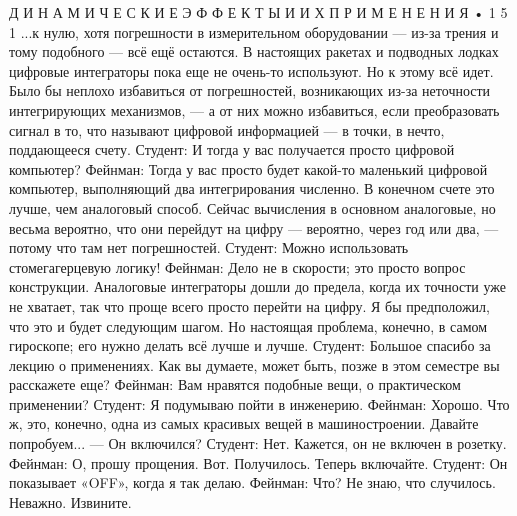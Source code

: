 \documentclass[10pt,oneside]{article}
\begin{document}
Д И Н А М И Ч Е С К И Е  Э Ф Ф Е К Т Ы  И  И Х  П Р И М Е Н Е Н И Я • 1 5 1 ...к нулю, хотя погрешности в измерительном оборудовании --- из-за трения и тому подобного --- всё ещё остаются. В настоящих ракетах и подводных лодках цифровые интеграторы пока еще не очень-то используют. Но к этому всё идет. Было бы неплохо избавиться от погрешностей, возникающих из-за неточности интегрирующих механизмов, --- а от них можно избавиться, если преобразовать сигнал в то, что называют цифровой информацией --- в точки, в нечто, поддающееся счету. Студент: И тогда у вас получается просто цифровой компьютер? Фейнман: Тогда у вас просто будет какой-то маленький цифровой компьютер, выполняющий два интегрирования численно. В конечном счете это лучше, чем аналоговый способ. Сейчас вычисления в основном аналоговые, но весьма вероятно, что они перейдут на цифру --- вероятно, через год или два, --- потому что там нет погрешностей. Студент: Можно использовать стомегагерцевую логику! Фейнман: Дело не в скорости; это просто вопрос конструкции. Аналоговые интеграторы дошли до предела, когда их точности уже не хватает, так что проще всего просто перейти на цифру. Я бы предположил, что это и будет следующим шагом. Но настоящая проблема, конечно, в самом гироскопе; его нужно делать всё лучше и лучше. Студент: Большое спасибо за лекцию о применениях. Как вы думаете, может быть, позже в этом семестре вы расскажете еще? Фейнман: Вам нравятся подобные вещи, о практическом применении? Студент: Я подумываю пойти в инженерию. Фейнман: Хорошо. Что ж, это, конечно, одна из самых красивых вещей в машиностроении. Давайте попробуем... --- Он включился? Студент: Нет. Кажется, он не включен в розетку. Фейнман: О, прошу прощения. Вот. Получилось. Теперь включайте. Студент: Он показывает «OFF», когда я так делаю. Фейнман: Что? Не знаю, что случилось. Неважно. Извините.\par
\end{document}
